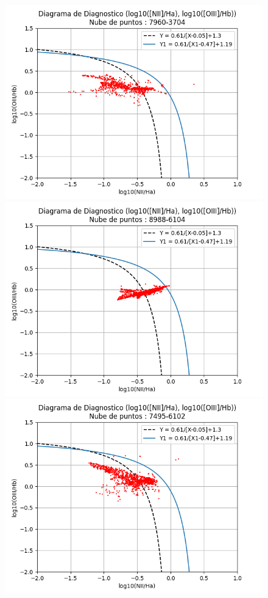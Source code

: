 \documentclass[10pt,twocolumn,a4paper]{opticajnl}
\begin{document}
\begin{figure}[h!]
    \centering
    \includegraphics[width=1\linewidth]{../Codigos/diagramasDeDiagnostico/diagrama7960-3704_fullres.png}
    \includegraphics[width=1\linewidth]{../Codigos/diagramasDeDiagnostico/diagrama8988-6104_fullres.png}
    \includegraphics[width=1\linewidth]{../Codigos/diagramasDeDiagnostico/diagrama7495-6102_fullres.png}

\end{figure}
\end{document}
